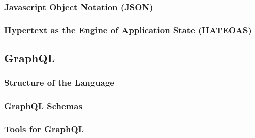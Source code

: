 \subsubsection{Javascript Object Notation (\acs{JSON})}

\subsubsection{Hypertext as the Engine of Application State (\acs{HATEOAS})}

\subsection{GraphQL}

\subsubsection{Structure of the Language}

\subsubsection{GraphQL Schemas}

\subsubsection{Tools for GraphQL}